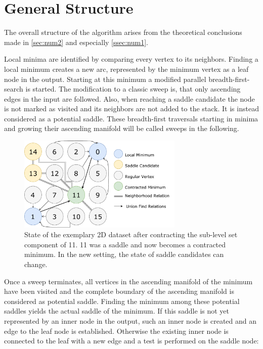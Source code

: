 \documentclass[%
	paper=A4,					%
	twoside=true,				%
	openright,					%
	parskip=full,				%
	chapterprefix=true,			%
	11pt,						%
	headings=normal,			%
	bibliography=totoc,			%
	listof=totoc,				%
	titlepage=on,				%
	captions=tableabove,		%
	draft=false,				%
]{scrreprt}%
\begin{document}
\section{General Structure}
The overall structure of the algorithm arises from the theoretical conclusions made in \ref{sec:num2} and especially \ref{ssec:num1}. 

Local minima are identified by comparing every vertex to its neighbors. Finding a local minimum creates a new arc, represented by the minimum vertex as a leaf node in the output. Starting at this minimum a modified parallel breadth-first-search is started. The modification to a classic sweep is, that only ascending edges in the input are followed. Also, when reaching a saddle candidate the node is not marked as visited and its neighbors are not added to the stack. It is instead considered as a potential saddle. These breadth-first traversals starting in minima and growing their ascending manifold will be called sweeps in the following.

\begin{figure}[h!]
\centering
\includegraphics[width=0.7\textwidth]{figures/ContractedSaddle.pdf}
\caption{State of the exemplary 2D dataset after contracting the sub-level set component of 11. 11 was a saddle and now becomes a contracted minimum. In the new setting, the state of saddle candidates can change.}
\label{fig:cons}
\end{figure}

Once a sweep terminates, all vertices in the ascending manifold of the minimum have been visited and the complete boundary of the ascending manifold is considered as potential saddle. Finding the minimum among these potential saddles yields the actual saddle of the minimum. If this saddle is not yet represented by an inner node in the output, such an inner node is created and an edge to the leaf node is established. Otherwise the existing inner node is connected to the leaf with a new edge and a test is performed on the saddle node: 
\end{document}
